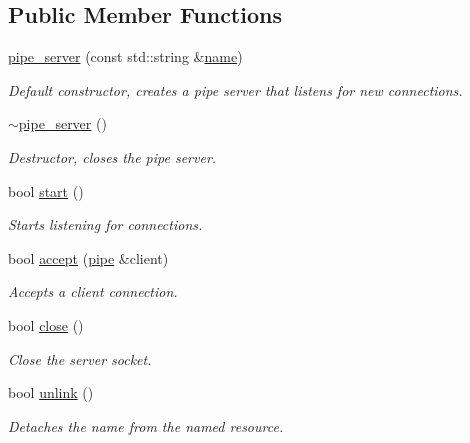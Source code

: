 \subsection*{Public Member Functions}
\begin{DoxyCompactItemize}
\item 
\mbox{\label{classcpen333_1_1process_1_1posix_1_1pipe__server_ac7c117eb8d63a079a4b0dab04b715247}} 
\hyperlink{classcpen333_1_1process_1_1posix_1_1pipe__server_ac7c117eb8d63a079a4b0dab04b715247}{pipe\+\_\+server} (const std\+::string \&\hyperlink{classcpen333_1_1process_1_1impl_1_1named__resource__base_a53986a0a1dd26a3602b842c45613b79d}{name})
\begin{DoxyCompactList}\small\item\em Default constructor, creates a pipe server that listens for new connections. \end{DoxyCompactList}\item 
\mbox{\label{classcpen333_1_1process_1_1posix_1_1pipe__server_a632a13c5f56c0722b347cafb9b276521}} 
\hyperlink{classcpen333_1_1process_1_1posix_1_1pipe__server_a632a13c5f56c0722b347cafb9b276521}{$\sim$pipe\+\_\+server} ()
\begin{DoxyCompactList}\small\item\em Destructor, closes the pipe server. \end{DoxyCompactList}\item 
bool \hyperlink{classcpen333_1_1process_1_1posix_1_1pipe__server_ae155615a438deba2ee73f0f92cd3f992}{start} ()
\begin{DoxyCompactList}\small\item\em Starts listening for connections. \end{DoxyCompactList}\item 
bool \hyperlink{classcpen333_1_1process_1_1posix_1_1pipe__server_a9acf7d28f7b58a58f04360110cae1fff}{accept} (\hyperlink{classcpen333_1_1process_1_1posix_1_1pipe}{pipe} \&client)
\begin{DoxyCompactList}\small\item\em Accepts a client connection. \end{DoxyCompactList}\item 
bool \hyperlink{classcpen333_1_1process_1_1posix_1_1pipe__server_a3c13c11fb1ca6cecb65992d11b4fe56a}{close} ()
\begin{DoxyCompactList}\small\item\em Close the server socket. \end{DoxyCompactList}\item 
bool \hyperlink{classcpen333_1_1process_1_1posix_1_1pipe__server_a5c4da1864cb0db53e76d960230f3a83a}{unlink} ()
\begin{DoxyCompactList}\small\item\em Detaches the name from the named resource. \end{DoxyCompactList}\end{DoxyCompactItemize}
